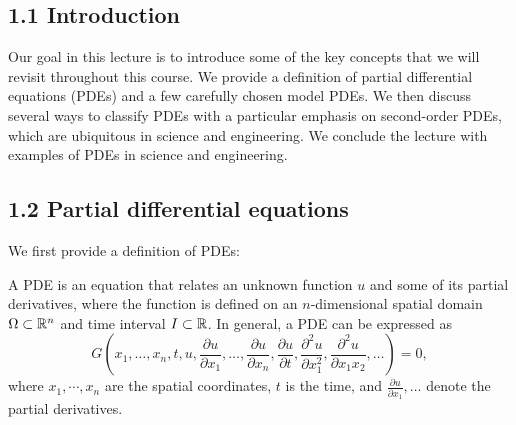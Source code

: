 

\subsection{1.1 Introduction}
Our goal in this lecture is to introduce some of the key concepts that we will revisit throughout this course. We provide a definition of partial differential equations (PDEs) and a few carefully chosen model PDEs. We then discuss several ways to classify PDEs with a particular emphasis on second-order PDEs, which are ubiquitous in science and engineering. We conclude the lecture with examples of PDEs in science and engineering.

\subsection{1.2 Partial differential equations}
We first provide a definition of PDEs:

\begin{definition}
    A PDE is an equation that relates an unknown function $u$ and some of its partial derivatives, where the function is defined on an $n$-dimensional spatial domain $\Omega \subset \mathbb{R}^n$ and time interval $I \subset \mathbb{R}$. In general, a PDE can be expressed as
    \[G\left(x_1, \dots, x_n, t, u, \frac{\partial u}{\partial x_1}, \dots, \frac{\partial u}{\partial x_n}, \frac{\partial u}{\partial t}, \frac{\partial^2 u}{\partial x_1^2}, \frac{\partial^2 u}{\partial x_1 x_2}, \dots\right) = 0,\]
    where $x_1, \cdots, x_n$ are the spatial coordinates, $t$ is the time, and $\frac{\partial u}{\partial x_1}, \dots$ denote the partial derivatives.
\end{definition}

